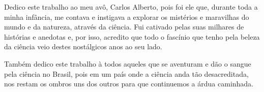 
Dedico este trabalho ao meu avô, Carlos Alberto, pois foi ele que, durante toda a minha infância, me contava e instigava a explorar os mistérios e maravilhas do mundo e da natureza, através da ciência. Fui cativado pelas suas milhares de histórias e anedotas e, por isso, acredito que todo o fascínio que tenho pela beleza da ciência veio destes nostálgicos anos ao seu lado.

Também dedico este trabalho à todos aqueles que se aventuram e dão o sangue pela ciência no Brasil, pois em um país onde a ciência anda tão desacreditada, nos restam os ombros uns dos outros para que continuemos a árdua caminhada.
